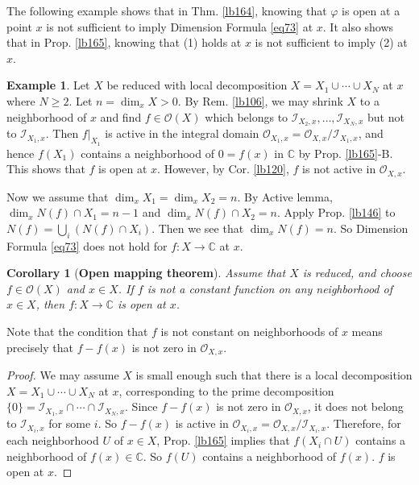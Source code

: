 \documentclass[12pt,b5paper,notitlepage]{report}
\theoremstyle{definition}
\newtheorem{eg}[df]{Example}
\theoremstyle{plain}
\newtheorem{co}[df]{Corollary}
\newcommand{\scr}{\mathscr}
\newcommand{\Cbb}{\mathbb C}
\numberwithin{equation}{section}
\begin{document}
The following example shows that in Thm. \ref{lb164}, knowing that $\varphi$ is open at a point $x$ is not sufficient to imply Dimension Formula \eqref{eq73} at $x$. It also shows that in Prop. \ref{lb165}, knowing that (1) holds at $x$ is not sufficient to imply (2) at $x$.





\begin{eg}
Let $X$ be reduced with local decomposition $X=X_1\cup\cdots\cup X_N$ at $x$ where $N\geq 2$. Let $n=\dim_xX>0$. By Rem. \ref{lb106}, we may shrink $X$ to a neighborhood of $x$ and find $f\in\scr O(X)$ which belongs to $\scr I_{X_2,x},\dots,\scr I_{X_N,x}$ but not to $\scr I_{X_1,x}$. Then $f|_{X_1}$ is active in the integral domain $\scr O_{X_1,x}=\scr O_{X,x}/\scr I_{X_1,x}$, and hence $f(X_1)$ contains a neighborhood of $0=f(x)$ in $\Cbb$ by Prop. \ref{lb165}-B. This shows that $f$ is open at $x$. However, by Cor. \ref{lb120}, $f$ is not active in $\scr O_{X,x}$. 

Now we assume that $\dim_xX_1=\dim_x X_2=n$. By Active lemma, $\dim_x N(f)\cap X_1=n-1$ and $\dim_x N(f)\cap X_2=n$. Apply Prop. \ref{lb146} to $N(f)=\bigcup_i (N(f)\cap X_i)$. Then we see that $\dim_x N(f)=n$. So Dimension Formula \eqref{eq73} does not hold for $f:X\rightarrow\Cbb$ at $x$.
\end{eg}



\begin{co}[\textbf{Open mapping theorem}]\label{lb241} 
Assume that $X$ is reduced, and choose $f\in\scr O(X)$ and $x\in X$. If $f$ is not a constant function on any neighborhood of $x\in X$, then $f:X\rightarrow\Cbb$ is open at $x$.
\end{co}

Note that the condition that $f$ is not constant on neighborhoods of $x$ means precisely that $f-f(x)$ is not zero in $\scr O_{X,x}$.


\begin{proof}
We may assume $X$ is small enough such that there is a local decomposition $X=X_1\cup\cdots\cup X_N$ at $x$, corresponding to the prime decomposition $\{0\}=\scr I_{X_1,x}\cap\cdots\cap\scr I_{X_N,x}$. Since $f-f(x)$ is not zero in $\scr O_{X,x}$, it does not belong to $\scr I_{X_i,x}$ for some $i$. So $f-f(x)$ is active in $\scr O_{X_i,x}=\scr O_{X,x}/\scr I_{X_i,x}$. Therefore, for each neighborhood $U$ of $x\in X$, Prop. \ref{lb165} implies that $f(X_i\cap U)$ contains a neighborhood of $f(x)\in\Cbb$. So $f(U)$ contains a neighborhood of $f(x)$. $f$ is open at $x$. 
\end{proof}
\end{document}
